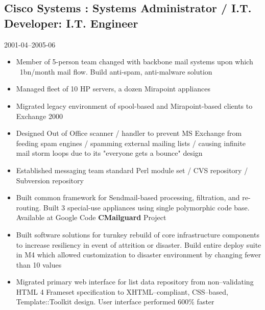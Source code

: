 \documentclass[]{article}
\begin{document}
\subsection*{Cisco Systems : Systems Administrator / I.T. Developer: I.T. Engineer}
  \label{ciscosystems_rdfa_cisco_1_title/_rdfa_cisco_1_titleb:_rdfa_cisco_1_desc}
  2001-04--2005-06
\begin{itemize}
    \item{Member of 5-person team changed with  backbone mail systems upon which ~1bn/month mail flow.  Build anti-spam, anti-malware solution}
    \item{Managed fleet of 10 HP servers, a dozen Mirapoint appliances}
    \item{Migrated legacy environment of spool-based and Mirapoint-based clients to Exchange 2000}
    \item{Designed Out of Office scanner / handler to prevent MS Exchange from feeding spam engines / spamming external mailing lists / causing infinite mail storm loops due to its "everyone gets a bounce" design}
    \item{Established messaging team standard Perl module set / CVS repository / Subversion repository}
    \item{Built common framework for Sendmail-based processing, filtration, and re-routing.  Built 3 special-use appliances using single polymorphic code base.  Available at Google Code {\bf CMailguard} Project}
    \item{Built software solutions for turnkey rebuild of core infrastructure components to increase resiliency in event of attrition or disaster.  Build entire deploy suite in M4 which allowed customization to disaster environment by changing fewer than 10 values}
    \item{Migrated primary web interface for list data repository from non–validating HTML 4 Frameset specification to XHTML–compliant, CSS–based, Template::Toolkit design.  User interface performed 600{\%} faster}
\end{itemize}
       
\end{document}
